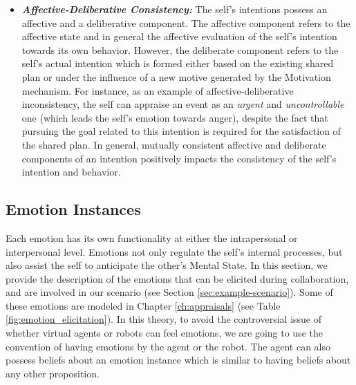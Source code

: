 \documentclass[12pt]{report}
\begin{document}
\begin{itemize}
  \item \textbf{\textit{Affective-Deliberative Consistency:}} The self's
  intentions possess an affective and a deliberative component. The affective
  component refers to the affective state and in general the affective
  evaluation of the self's intention towards its own behavior. However, the
  deliberate component refers to the self's actual intention which is formed
  either based on the existing shared plan or under the influence of a new
  motive generated by the Motivation mechanism. For instance, as an example of
  affective-deliberative inconsistency, the self can appraise an event as an
  \textit{urgent} and \textit{uncontrollable} one (which leads the self's
  emotion towards anger), despite the fact that pursuing the goal related
  to this intention is required for the satisfaction of the shared plan. In
  general, mutually consistent affective and deliberate components of an
  intention positively impacts the consistency of the self's intention and
  behavior.
\end{itemize}

\subsection{Emotion Instances}
\label{section-emotion-instances}

Each emotion has its own functionality at either the intrapersonal or
interpersonal level. Emotions not only regulate the self's internal processes,
but also assist the self to anticipate the other's Mental State. In this
section, we provide the description of the emotions that can be elicited
during collaboration, and are involved in our scenario (see Section
\ref{sec:example-scenario}). Some of these emotions are modeled in
Chapter \ref{ch:appraisals} (see Table \ref{fig:emotion_elicitation}). In this
theory, to avoid the controversial issue of whether virtual agents or robots can
feel emotions, we are going to use the convention of having emotions by the
agent or the robot. The agent can also possess beliefs about an emotion instance
which is similar to having beliefs about any other proposition.
\end{document}
